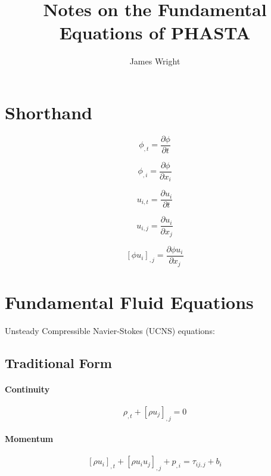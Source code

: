 \documentclass[12pt, letterpaper, twoside]{article}
\title{Notes on the Fundamental Equations of PHASTA}
\author{James Wright}
\begin{document}
\maketitle

\section{Shorthand}
    \begin{equation}
        \phi_{,t} = \frac{\partial \phi}{\partial t}
    \end{equation}

    \begin{equation}
        \phi_{,i} = \frac{\partial \phi}{\partial x_i}
    \end{equation}

    \begin{equation}
        u_{i,t} = \frac{\partial u_i}{\partial t}
    \end{equation}

    \begin{equation}
        u_{i,j} = \frac{\partial u_i}{\partial x_j}
    \end{equation}

    \begin{equation}
        \left[\phi u_i \right]_{,j} = \frac{\partial \phi u_i}{\partial x_j}
    \end{equation}

\section{Fundamental Fluid Equations}
Unsteady Compressible Navier-Stokes (UCNS) equations:

    \subsection{Traditional Form}
    \paragraph{Continuity}
        \begin{equation}\label{eq:fund_continuity}
            \rho_{,t} + \left[\rho u_j \right]_{,j} = 0
        \end{equation}

    \paragraph{Momentum}
        \begin{equation}\label{eq:fund_momentum}
            \left[\rho u_i \right]_{,t} + \left[\rho u_i u_j \right]_{,j} + p_{,i} = \tau_{ij,j} + b_i
        \end{equation}
        
\end{document}
